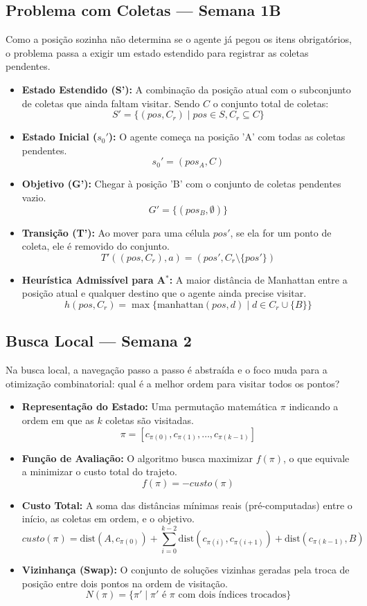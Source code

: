 \documentclass[12pt,a4paper]{article}
\begin{document}
\subsection{Problema com Coletas — Semana 1B}
Como a posição sozinha não determina se o agente já pegou os itens obrigatórios, o problema passa a exigir um estado estendido para registrar as coletas pendentes.
\begin{itemize}
    \item \textbf{Estado Estendido (S'):} A combinação da posição atual com o subconjunto de coletas que ainda faltam visitar. Sendo $C$ o conjunto total de coletas:
    $$S' = \{ (pos, C_r) \mid pos \in S, C_r \subseteq C \}$$
    \item \textbf{Estado Inicial ($s_0'$):} O agente começa na posição 'A' com todas as coletas pendentes.
    $$s_0' = (pos_A, C)$$
    \item \textbf{Objetivo (G'):} Chegar à posição 'B' com o conjunto de coletas pendentes vazio.
    $$G' = \{ (pos_B, \emptyset) \}$$
    \item \textbf{Transição (T'):} Ao mover para uma célula $pos'$, se ela for um ponto de coleta, ele é removido do conjunto.
    $$T'((pos, C_r), a) = (pos', C_r \setminus \{pos'\})$$
    \item \textbf{Heurística Admissível para A$^*$:} A maior distância de Manhattan entre a posição atual e qualquer destino que o agente ainda precise visitar.
    $$h(pos, C_r) = \max \{ \text{manhattan}(pos, d) \mid d \in C_r \cup \{B\} \}$$
\end{itemize}

\subsection{Busca Local — Semana 2}
Na busca local, a navegação passo a passo é abstraída e o foco muda para a otimização combinatorial: qual é a melhor ordem para visitar todos os pontos?
\begin{itemize}
    \item \textbf{Representação do Estado:} Uma permutação matemática $\pi$ indicando a ordem em que as $k$ coletas são visitadas.
    $$\pi = [c_{\pi(0)}, c_{\pi(1)}, \dots, c_{\pi(k-1)}]$$
    \item \textbf{Função de Avaliação:} O algoritmo busca maximizar $f(\pi)$, o que equivale a minimizar o custo total do trajeto.
    $$f(\pi) = -custo(\pi)$$
    \item \textbf{Custo Total:} A soma das distâncias mínimas reais (pré-computadas) entre o início, as coletas em ordem, e o objetivo.
    $$custo(\pi) = \text{dist}(A, c_{\pi(0)}) + \sum_{i=0}^{k-2} \text{dist}(c_{\pi(i)}, c_{\pi(i+1)}) + \text{dist}(c_{\pi(k-1)}, B)$$
    \item \textbf{Vizinhança (Swap):} O conjunto de soluções vizinhas geradas pela troca de posição entre dois pontos na ordem de visitação.
    $$N(\pi) = \{ \pi' \mid \pi' \text{ é } \pi \text{ com dois índices trocados} \}$$
\end{itemize}
\end{document}
